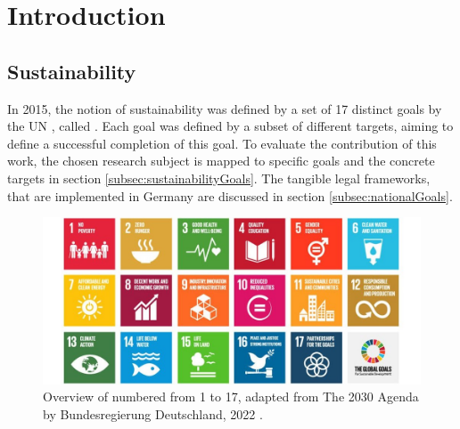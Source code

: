 \chapter{Introduction}\label{chap:introduction}

\section{Sustainability}\label{sec:sustainability}
In 2015, the notion of \gls{sustainability} was defined by a set of 17 distinct goals by the UN \cite{UN_sustain}, called . Each goal was defined by a subset of different targets, aiming to define a successful completion of this goal. To evaluate the contribution of this work, the chosen research subject is mapped to specific goals and the concrete targets in section \ref{subsec:sustainabilityGoals}. The tangible legal frameworks, that are implemented in Germany are discussed in section \ref{subsec:nationalGoals}.

\begin{figure}[!h]
	\centering
	\includegraphics[width=\linewidth]{images/kacheln-the-global-goals.jpg}
	\caption{Overview of  numbered from 1 to 17, adapted from The 2030 Agenda by Bundesregierung Deutschland, 2022 \cite{pic:eu_goals}.}
	\label{fig:sustainGoals}
\end{figure}


